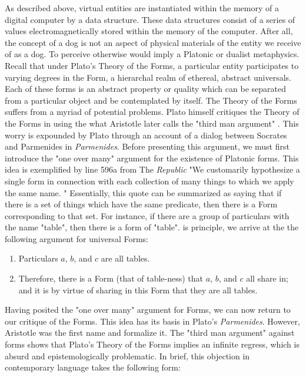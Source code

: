 As described above, virtual entities are instantiated within the memory of a digital computer by a data structure. These data structures consist of a series of values electromagnetically stored within the memory of the computer. After all, the concept of a dog is not an aspect of physical materials of the entity we receive of as a dog. To perceive otherwise would imply a Platonic or dualist metaphysics. Recall that under Plato's Theory of the Forms, a particular entity participates to varying degrees in the Form, a hierarchal realm of  ethereal, abstract universals. Each of these forms is an abstract property or quality which can be separated from a particular object and be contemplated by itself. The Theory of the Forms suffers from a myriad of potential problems. Plato himself critiques the Theory of the Forms in \cite{plato1921plato} using the what Aristotle later calls the "third man argument" \cite{aristotle1992on}. This worry is expounded by Plato through an account of a dialog between Socrates and Parmenides in \textit{Parmenides}. Before presenting this argument, we must first introduce the "one over many" argument for the existence of Platonic forms. This idea is exemplified by line 596a from The \textit{Republic} "We customarily hypothesize a single form in connection with each collection of many things to which we apply the same name.
 " \cite{plato2014the} Essentially, this quote can be summarized as saying that if there is a set of things which have the same predicate, then there is a Form corresponding to that set. For instance, if there are a group of particulars with the name "table", then there is a form of "table". is principle, we arrive at the the following argument for universal Forms:
 \begin{enumerate}
 	\item Particulars $a$, $b$, and $c$ are all tables.
 	\item Therefore, there is a Form (that of table-ness) that $a$, $b$, and $c$ all share in; and it is by virtue of sharing in this Form that they are all tables.	
 \end{enumerate} 
 Having posited the "one over many" argument for Forms, we can now return to our critique of the Forms. This idea has its basis in Plato's 
 \textit{Parmenides}. However, Aristotle was the first name and formalize it. The "third man argument" against forms shows that Plato's Theory of the Forms implies an infinite regress, which is absurd and epistemologically problematic. \cite{bibid}
 In brief, this objection in contemporary language takes the following form:
